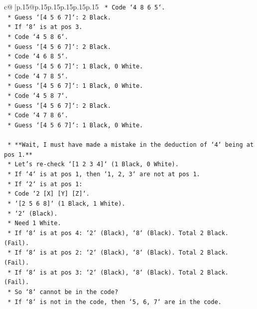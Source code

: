 \documentclass{article}
\begin{document}
{\begin{supertabular}{c@{$\;$}|p{.15\linewidth}@{}p{.15\linewidth}p{.15\linewidth}p{.15\linewidth}p{.15\linewidth}p{.15\linewidth}}
{{{\texttt{        *   Code `4 8 6 5`.} \\
\texttt{            *   Guess `{[}4 5 6 7{]}`: 2 Black.} \\
\texttt{        *   If `8` is at pos 3.} \\
\texttt{        *   Code `4 5 8 6`.} \\
\texttt{            *   Guess `{[}4 5 6 7{]}`: 2 Black.} \\
\texttt{        *   Code `4 6 8 5`.} \\
\texttt{            *   Guess `{[}4 5 6 7{]}`: 1 Black, 0 White.} \\
\texttt{        *   Code `4 7 8 5`.} \\
\texttt{            *   Guess `{[}4 5 6 7{]}`: 1 Black, 0 White.} \\
\texttt{        *   Code `4 5 8 7`.} \\
\texttt{            *   Guess `{[}4 5 6 7{]}`: 2 Black.} \\
\texttt{        *   Code `4 7 8 6`.} \\
\texttt{            *   Guess `{[}4 5 6 7{]}`: 1 Black, 0 White.} \\
\\ 
\texttt{    *   **Wait, I must have made a mistake in the deduction of `4` being at pos 1.**} \\
\texttt{        *   Let's re{-}check `{[}1 2 3 4{]}` (1 Black, 0 White).} \\
\texttt{        *   If `4` is at pos 1, then `1, 2, 3` are not at pos 1.} \\
\texttt{        *   If `2` is at pos 1:} \\
\texttt{            *   Code `2 {[}X{]} {[}Y{]} {[}Z{]}`.} \\
\texttt{            *   `{[}2 5 6 8{]}` (1 Black, 1 White).} \\
\texttt{            *   `2` (Black).} \\
\texttt{            *   Need 1 White.} \\
\texttt{            *   If `8` is at pos 4: `2` (Black), `8` (Black). Total 2 Black. (Fail).} \\
\texttt{            *   If `8` is at pos 2: `2` (Black), `8` (Black). Total 2 Black. (Fail).} \\
\texttt{            *   If `8` is at pos 3: `2` (Black), `8` (Black). Total 2 Black. (Fail).} \\
\texttt{            *   So `8` cannot be in the code?} \\
\texttt{            *   If `8` is not in the code, then `5, 6, 7` are in the code.} \\
}}}
\end{supertabular}}
\end{document}
